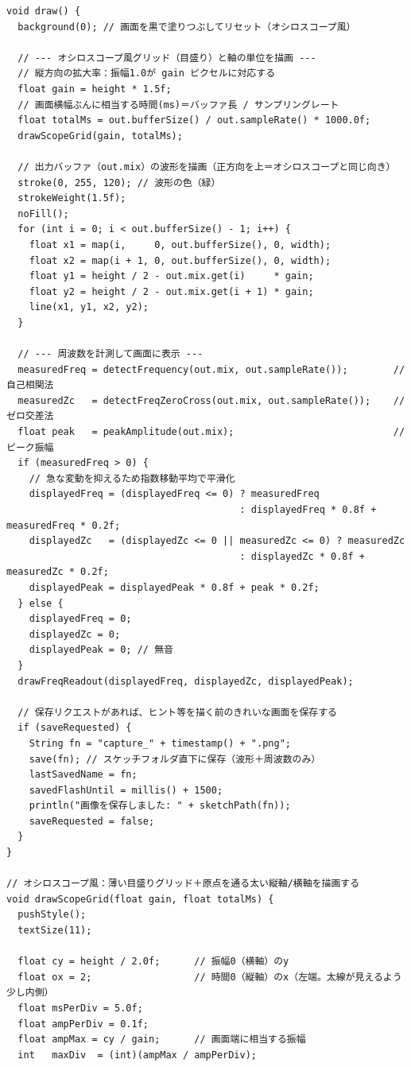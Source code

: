 \begin{lstlisting}
void draw() {
  background(0); // 画面を黒で塗りつぶしてリセット（オシロスコープ風）

  // --- オシロスコープ風グリッド（目盛り）と軸の単位を描画 ---
  // 縦方向の拡大率：振幅1.0が gain ピクセルに対応する
  float gain = height * 1.5f;
  // 画面横幅ぶんに相当する時間(ms)＝バッファ長 / サンプリングレート
  float totalMs = out.bufferSize() / out.sampleRate() * 1000.0f;
  drawScopeGrid(gain, totalMs);

  // 出力バッファ（out.mix）の波形を描画（正方向を上＝オシロスコープと同じ向き）
  stroke(0, 255, 120); // 波形の色（緑）
  strokeWeight(1.5f);
  noFill();
  for (int i = 0; i < out.bufferSize() - 1; i++) {
    float x1 = map(i,     0, out.bufferSize(), 0, width);
    float x2 = map(i + 1, 0, out.bufferSize(), 0, width);
    float y1 = height / 2 - out.mix.get(i)     * gain;
    float y2 = height / 2 - out.mix.get(i + 1) * gain;
    line(x1, y1, x2, y2);
  }

  // --- 周波数を計測して画面に表示 ---
  measuredFreq = detectFrequency(out.mix, out.sampleRate());        // 自己相関法
  measuredZc   = detectFreqZeroCross(out.mix, out.sampleRate());    // ゼロ交差法
  float peak   = peakAmplitude(out.mix);                            // ピーク振幅
  if (measuredFreq > 0) {
    // 急な変動を抑えるため指数移動平均で平滑化
    displayedFreq = (displayedFreq <= 0) ? measuredFreq
                                         : displayedFreq * 0.8f + measuredFreq * 0.2f;
    displayedZc   = (displayedZc <= 0 || measuredZc <= 0) ? measuredZc
                                         : displayedZc * 0.8f + measuredZc * 0.2f;
    displayedPeak = displayedPeak * 0.8f + peak * 0.2f;
  } else {
    displayedFreq = 0;
    displayedZc = 0;
    displayedPeak = 0; // 無音
  }
  drawFreqReadout(displayedFreq, displayedZc, displayedPeak);

  // 保存リクエストがあれば、ヒント等を描く前のきれいな画面を保存する
  if (saveRequested) {
    String fn = "capture_" + timestamp() + ".png";
    save(fn); // スケッチフォルダ直下に保存（波形＋周波数のみ）
    lastSavedName = fn;
    savedFlashUntil = millis() + 1500;
    println("画像を保存しました: " + sketchPath(fn));
    saveRequested = false;
  }
}

// オシロスコープ風：薄い目盛りグリッド＋原点を通る太い縦軸/横軸を描画する
void drawScopeGrid(float gain, float totalMs) {
  pushStyle();
  textSize(11);

  float cy = height / 2.0f;      // 振幅0（横軸）のy
  float ox = 2;                  // 時間0（縦軸）のx（左端。太線が見えるよう少し内側）
  float msPerDiv = 5.0f;
  float ampPerDiv = 0.1f;
  float ampMax = cy / gain;      // 画面端に相当する振幅
  int   maxDiv  = (int)(ampMax / ampPerDiv);


\end{lstlisting}
